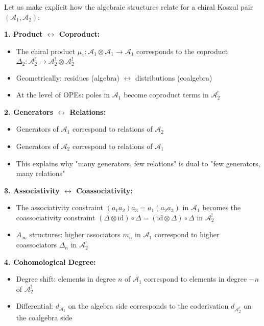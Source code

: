 \begin{remark}
Let us make explicit how the algebraic structures relate for a chiral Koszul pair $(\mathcal{A}_1, \mathcal{A}_2)$:

\textbf{1. Product $\leftrightarrow$ Coproduct:}
\begin{itemize}
\item The chiral product $\mu_1: \mathcal{A}_1 \otimes \mathcal{A}_1 \to \mathcal{A}_1$ corresponds to the coproduct $\Delta_2: \mathcal{A}_2^! \to \mathcal{A}_2^! \otimes \mathcal{A}_2^!$
\item Geometrically: residues (algebra) $\leftrightarrow$ distributions (coalgebra)
\item At the level of OPEs: poles in $\mathcal{A}_1$ become coproduct terms in $\mathcal{A}_2^!$
\end{itemize}

\textbf{2. Generators $\leftrightarrow$ Relations:}
\begin{itemize}
\item Generators of $\mathcal{A}_1$ correspond to relations of $\mathcal{A}_2$
\item Generators of $\mathcal{A}_2$ correspond to relations of $\mathcal{A}_1$
\item This explains why "many generators, few relations" is dual to "few generators, many relations"
\end{itemize}

\textbf{3. Associativity $\leftrightarrow$ Coassociativity:}
\begin{itemize}
\item The associativity constraint $(a_1 a_2) a_3 = a_1 (a_2 a_3)$ in $\mathcal{A}_1$ becomes the coassociativity constraint $(\Delta \otimes \text{id}) \circ \Delta = (\text{id} \otimes \Delta) \circ \Delta$ in $\mathcal{A}_2^!$
\item $A_\infty$ structures: higher associators $m_n$ in $\mathcal{A}_1$ correspond to higher coassociators $\Delta_n$ in $\mathcal{A}_2^!$
\end{itemize}

\textbf{4. Cohomological Degree:}
\begin{itemize}
\item Degree shift: elements in degree $n$ of $\mathcal{A}_1$ correspond to elements in degree $-n$ of $\mathcal{A}_2^!$
\item Differential: $d_{\mathcal{A}_1}$ on the algebra side corresponds to the coderivation $d_{\mathcal{A}_2^!}$ on the coalgebra side
\end{itemize}
\end{remark}

